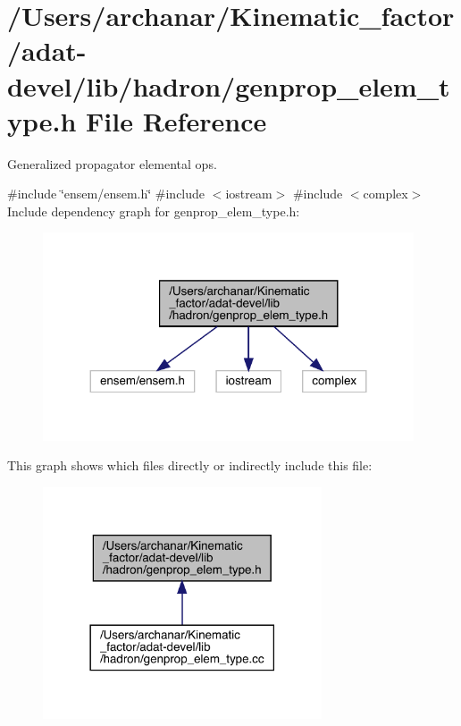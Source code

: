 \hypertarget{adat-devel_2lib_2hadron_2genprop__elem__type_8h}{}\section{/\+Users/archanar/\+Kinematic\+\_\+factor/adat-\/devel/lib/hadron/genprop\+\_\+elem\+\_\+type.h File Reference}
\label{adat-devel_2lib_2hadron_2genprop__elem__type_8h}


Generalized propagator elemental ops.  


{\ttfamily \#include \char`\"{}ensem/ensem.\+h\char`\"{}}\newline
{\ttfamily \#include $<$iostream$>$}\newline
{\ttfamily \#include $<$complex$>$}\newline
Include dependency graph for genprop\+\_\+elem\+\_\+type.\+h\+:
\nopagebreak
\begin{figure}[H]
\begin{center}
\leavevmode
\includegraphics[width=311pt]{dd/dae/adat-devel_2lib_2hadron_2genprop__elem__type_8h__incl}
\end{center}
\end{figure}
This graph shows which files directly or indirectly include this file\+:
\nopagebreak
\begin{figure}[H]
\begin{center}
\leavevmode
\includegraphics[width=234pt]{d5/d52/adat-devel_2lib_2hadron_2genprop__elem__type_8h__dep__incl}
\end{center}
\end{figure}
